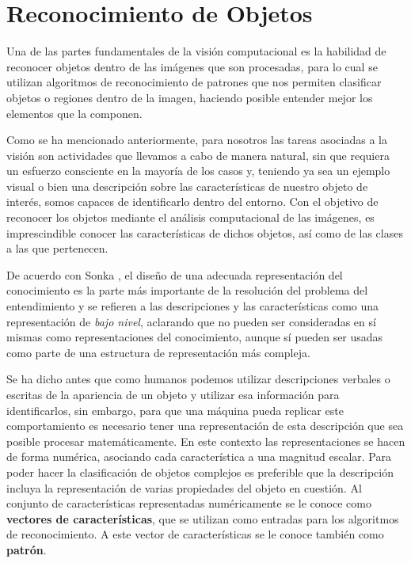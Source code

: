 
\section{Reconocimiento de Objetos}
Una de las partes fundamentales de la visión computacional es la habilidad de reconocer objetos dentro de las imágenes que son procesadas, para lo cual se utilizan algoritmos de reconocimiento de patrones que nos permiten clasificar objetos o regiones dentro de la imagen, haciendo posible entender mejor los elementos que la componen.

Como se ha mencionado anteriormente, para nosotros las tareas asociadas a la visión son actividades que llevamos a cabo de manera natural, sin que requiera un esfuerzo consciente en la mayoría de los casos y, teniendo ya sea un ejemplo visual o bien una descripción sobre las características de nuestro objeto de interés, somos capaces de identificarlo dentro del entorno. Con el objetivo de reconocer los objetos mediante el análisis computacional de las imágenes, es imprescindible conocer las características de dichos objetos, así como de las clases a las que pertenecen.

De acuerdo con Sonka \cite{sonka_image_2008}, el diseño de una adecuada representación del conocimiento es la parte más importante de la resolución del problema del entendimiento y se refieren a las descripciones y las características como una representación de \textit{bajo nivel}, aclarando que no pueden ser consideradas en sí mismas como representaciones del conocimiento, aunque sí pueden ser usadas como parte de una estructura de representación más compleja.

Se ha dicho antes que como humanos podemos utilizar descripciones verbales o escritas de la apariencia de un objeto y utilizar esa información para identificarlos, sin embargo, para que una máquina pueda replicar este comportamiento es necesario tener  una representación de esta descripción que sea posible procesar matemáticamente. En este contexto las representaciones se hacen de forma numérica, asociando cada característica a una magnitud escalar. 
Para poder hacer la clasificación de objetos complejos es preferible que la descripción incluya la representación de varias propiedades del objeto en cuestión. Al conjunto de características representadas numéricamente se le conoce como \textbf{vectores de características}, que se utilizan como entradas para los algoritmos de reconocimiento. A este vector de características se le conoce también como \textbf{patrón}.

